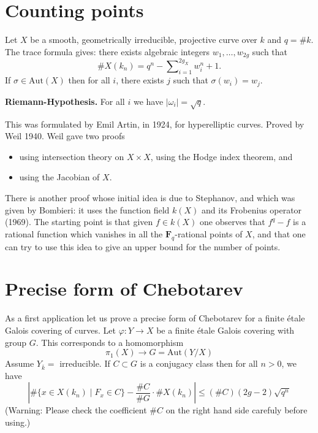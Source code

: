 \section{Counting points}
\label{section-counting}

\noindent
Let $X$ be a smooth, geometrically irreducible,
projective curve over $k$ and $q = \# k$. The trace formula gives:
there exists algebraic integers $w_1, \ldots, w_{2g}$ such that
$$
\# X(k_n) = q^n - \sum\nolimits_{i = 1}^{2g_X} w_i^n + 1.
$$
If $\sigma\in \text{Aut}(X)$ then for all $i$, there exists $j$ such that
$\sigma(w_i)=w_j$.

\medskip\noindent
{\bf Riemann-Hypothesis.} For all $i$ we have $|\omega_i| = \sqrt{q}$.

\medskip\noindent
This was formulated by Emil Artin, in 1924, for
hyperelliptic curves. Proved by Weil 1940. Weil gave two proofs
\begin{itemize}
\item using intersection theory on $X \times X$, using the
Hodge index theorem, and
\item using the Jacobian of $X$.
\end{itemize}
There is another proof whose initial idea is due to Stephanov, and
which was given by Bombieri: it uses the function field $k(X)$ and
its Frobenius operator (1969). The starting point is that given
$f\in k(X)$ one observes that $f^q - f$ is a rational function which
vanishes in all the $\mathbf{F}_q$-rational points of $X$, and that one
can try to use this idea to give an upper bound for the number of points.


\section{Precise form of Chebotarev}
\label{section-chebotarev}

\noindent
As a first application let us prove a precise form of Chebotarev
for a finite \'etale Galois covering of curves.
Let $\varphi : Y \to X$ be a finite \'etale Galois covering with
group $G$. This corresponds to a homomorphism
$$
\pi_1(X) \longrightarrow G = \text{Aut}(Y/X)
$$
Assume $Y_{\overline{k}} = $ irreducible. If $C\subset G$ is a conjugacy
class then for all $n > 0$, we have
$$
| \# \{x \in X(k_n) \mid F_x \in C\} - \frac{\# C}{\# G} \cdot \# X(k_n) |
\leq
(\# C)(2g - 2) \sqrt{q^n}
$$
(Warning: Please check the coefficient $\# C$ on the right hand side
carefuly before using.)

